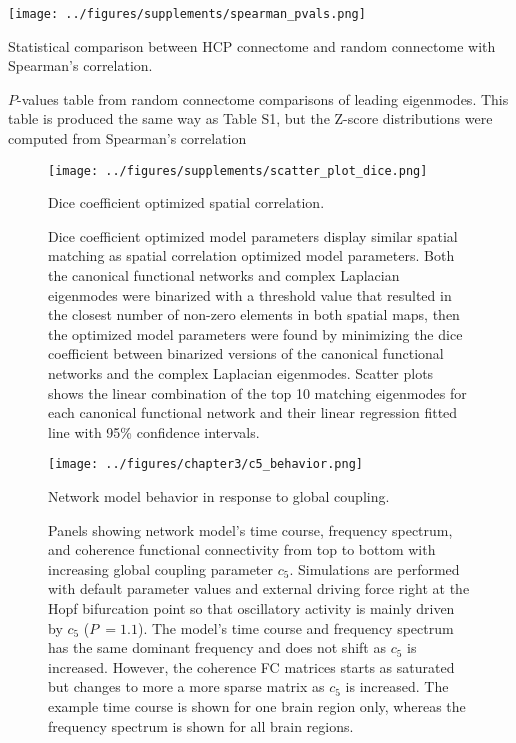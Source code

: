 \begin{table}[ht!]
\centering
\texttt{[image: ../figures/supplements/spearman\_pvals.png]}
\caption{Statistical comparison between HCP connectome and random connectome with Spearman's correlation.}
\caption*{$P$-values table from random connectome comparisons of leading eigenmodes. This table is produced the same way as Table S1, but the Z-score distributions were computed from Spearman's correlation}
\label{tab:S2}
\end{table}

\begin{figure}[ht!]
\centering
\texttt{[image: ../figures/supplements/scatter\_plot\_dice.png]}
\caption{Dice coefficient optimized spatial correlation.}
\caption*{Dice coefficient optimized model parameters display similar spatial matching as spatial correlation optimized model parameters. Both the canonical functional networks and complex Laplacian eigenmodes were binarized with a threshold value that resulted in the closest number of non-zero elements in both spatial maps, then the optimized model parameters were found by minimizing the dice coefficient between binarized versions of the canonical functional networks and the complex Laplacian eigenmodes. Scatter plots shows the linear combination of the top 10 matching eigenmodes for each canonical functional network and their linear regression fitted line with 95\% confidence intervals.}
\label{fig:S3}
\end{figure}

\begin{figure}[htbp]
    \centering
    \texttt{[image: ../figures/chapter3/c5\_behavior.png]}
    \caption{Network model behavior in response to global coupling.}
    \caption*{Panels showing network model's time course, frequency spectrum, and coherence functional connectivity from top to bottom with increasing global coupling parameter $c_5$. Simulations are performed with default parameter values and external driving force right at the Hopf bifurcation point so that oscillatory activity is mainly driven by $c_5$ ($P ~= 1.1$). The model's time course and frequency spectrum has the same dominant frequency and does not shift as $c_5$ is increased. However, the coherence FC matrices starts as saturated but changes to more a more sparse matrix as $c_5$ is increased. The example time course is shown for one brain region only, whereas the frequency spectrum is shown for all brain regions.}
    \label{fig:c5_behavior}
\end{figure}

